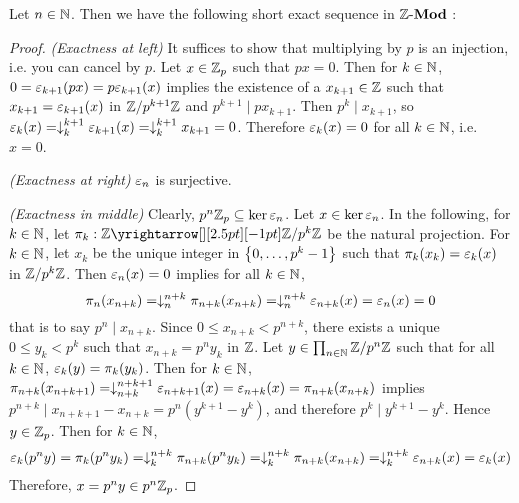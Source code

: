 \begin{prop}[Truncation]
  
  Let $n \in \N$. 
  Then we have the following short exact sequence in $\MOD[\Z]$ : 
  \begin{figure}[H]
    \centering
  \end{figure}
\end{prop}
\begin{proof}
  \textit{(Exactness at left)}
  It suffices to show that multiplying by $p$ is an injection,
  i.e. you can cancel by $p$. 
  Let $x \in \Z_p$ such that $p x = 0$. 
  Then for $k \in \N$, $0 = \ep_{k+1}(p x) = p \ep_{k+1}(x)$ implies 
  the existence of a $x_{k+1} \in \Z$ such that 
  $x_{k+1} = \ep_{k+1}(x)$ in $\Z/p^{k+1}\Z$ and 
  $p^{k+1} \mid p x_{k+1}$. 
  Then $p^k \mid x_{k+1}$, so 
  $\ep_k(x) = \fall{k}{k+1} \ep_{k+1}(x) = \fall{k}{k+1} x_{k+1} = 0$. 
  Therefore $\ep_k(x) = 0$ for all $k \in \N$, i.e. $x = 0$. 

  \textit{(Exactness at right)} $\ep_n$ is surjective. 

  \textit{(Exactness in middle)} Clearly, $p^n\Z_p \subs \ker \ep_n$. 
  Let $x \in \ker \ep_n$.
  In the following, for $k \in \N$, 
  let $\pi_k : \map{\Z}{\Z/p^k\Z}{}{}$ be the natural projection. 
  For $k \in \N$, let $x_k$ be the unique integer in $\set{0,\dots,p^k-1}$ 
  such that $\pi_k(x_k) = \ep_k(x)$ in $\Z/p^k\Z$. 
  Then $\ep_n(x) = 0$ implies for all $k \in \N$, 
  \[ \pi_n (x_{n+k}) = \fall{n}{n+k} \pi_{n+k}(x_{n+k}) 
  = \fall{n}{n+k} \ep_{n+k}(x) = \ep_n(x) = 0 \] 
  that is to say $p^n \mid x_{n+k}$. 
  Since $0 \leq x_{n+k} < p^{n+k}$, 
  there exists a unique $0 \leq y_k < p^k$ such that 
  $x_{n+k} = p^n y_k$ in $\Z$. 
  Let $y \in \dprod{n \in \N}{} \Z/p^n\Z$ such that for all $k \in\N$, 
  $\ep_k(y) = \pi_k(y_k)$. 
  Then for $k \in \N$, 
  $\pi_{n+k}(x_{n+k+1}) = \fall{n+k}{n+k+1}\ep_{n+k+1}(x) 
  = \ep_{n+k}(x) = \pi_{n+k}(x_{n+k})$
  implies $p^{n+k} \mid x_{n+k+1} - x_{n+k} = p^n(y^{k+1} - y^k)$,
  and therefore $p^k \mid y^{k+1} - y^k$.
  Hence $y \in \Z_p$. 
  Then for $k \in \N$, 
  \[
    \ep_k(p^n y) = \pi_k(p^n y_k) = \fall{k}{n+k}\pi_{n+k}(p^n y_k)
    = \fall{k}{n+k} \pi_{n+k}(x_{n+k}) = \fall{k}{n+k} \ep_{n+k}(x)
    = \ep_k(x)
  \]
  Therefore, $x = p^n y \in p^n \Z_p$.
\end{proof}
